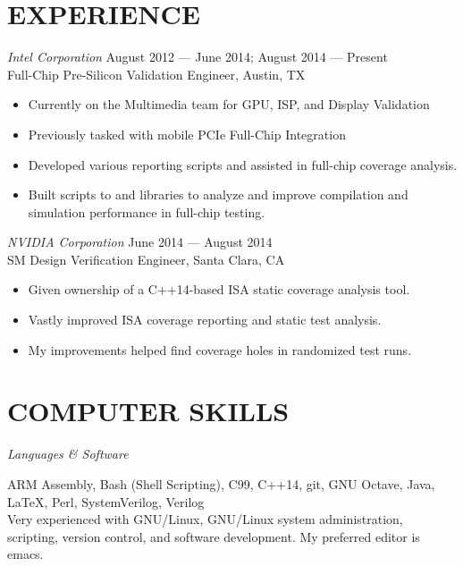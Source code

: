 \documentclass[margin]{res}
\begin{document}
\begin{resume}
  \section{EXPERIENCE}
  {\sl Intel Corporation}
  \hfill August 2012 --- June 2014; August 2014 --- Present \\
  Full-Chip Pre-Silicon Validation Engineer, Austin, TX
  \vspace{0.25em}
  \begin{itemize}
  \item Currently on the Multimedia team for GPU, ISP, and
    Display Validation
  \item Previously tasked with mobile PCIe Full-Chip Integration
  \item Developed various reporting scripts and assisted in full-chip
    coverage analysis.
  \item Built scripts to and libraries to analyze and improve
    compilation and simulation performance in full-chip testing.
  \end{itemize}
  {\sl NVIDIA Corporation}
  \hfill June 2014 --- August 2014 \\
  SM Design Verification Engineer, Santa Clara, CA
  \vspace{0.25em}
  \begin{itemize}
  \item Given ownership of a C++14-based ISA static coverage analysis
    tool.
  \item Vastly improved ISA coverage reporting and static test
    analysis.
  \item My improvements helped find coverage holes in randomized test
    runs.
  \end{itemize}

  \section{COMPUTER SKILLS}
  {\sl Languages \& Software} \\
  \vspace{-1.0em}
  \begin{adjustwidth}{1.5em}{0pt}
    ARM Assembly, Bash (Shell Scripting), C99, C++14, git, GNU Octave,
    Java, \LaTeX, Perl, SystemVerilog, Verilog
    \vspace{0.5em} \\
    Very experienced with GNU/Linux, GNU/Linux system administration,
    scripting, version control, and software development. My preferred
    editor is emacs.
  \end{adjustwidth}


\end{resume}
\end{document}
